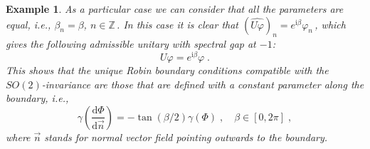 \documentclass[a4paper,12pt]{amsart}
\renewcommand{\d}{\mathrm{d}}
\newcommand{\1}{\mathbb{I}}
\newtheorem{example}[theorem]{Example}
\numberwithin{equation}{section}
\numberwithin{theorem}{section}
\begin{document}
\begin{example}
As a particular case we can consider that all the parameters are equal, i.e., $\beta_n=\beta$, $n\in\mathbb{Z}$\,.
In this case it is clear that $(\widehat{U\varphi})_n=e^{\mathrm{i}\beta}\varphi_n$\,, which gives the following 
admissible unitary with spectral gap at $-1$:
$$U\varphi=e^{\mathrm{i}\beta}\varphi\;.$$
This shows that the unique Robin boundary conditions compatible with the $SO(2)$-invariance are those that are defined with a 
constant parameter along the boundary, i.e., 
\begin{equation}
\gamma\left(\frac{\d\Phi}{\d \vec{n}}\right)=-\tan(\beta/2)\gamma(\Phi)\;,\quad\beta\in[0,2\pi]\;,
\end{equation}
where $\vec{n}$ stands for normal vector field pointing outwards to the boundary.
\end{example}



\end{document}
